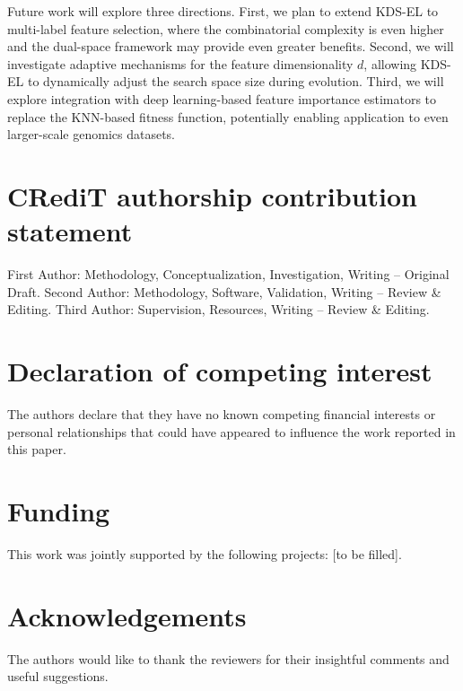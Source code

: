 \documentclass[a4paper,fleqn]{cas-dc}
\begin{document}
\begin{sloppypar}
	\par{
	Future work will explore three directions.
	First, we plan to extend KDS-EL to multi-label feature selection,
	where the combinatorial complexity is even higher and the dual-space
	framework may provide even greater benefits.
	Second, we will investigate adaptive mechanisms for the feature
	dimensionality $d$, allowing KDS-EL to dynamically adjust the
	search space size during evolution.
	Third, we will explore integration with deep learning-based
	feature importance estimators to replace the KNN-based fitness
	function, potentially enabling application to even larger-scale
	genomics datasets.
	}



	\section*{CRediT authorship contribution statement}
	\par{First Author: Methodology, Conceptualization, Investigation,
	Writing -- Original Draft.
	Second Author: Methodology, Software, Validation, Writing -- Review
	\& Editing.
	Third Author: Supervision, Resources, Writing -- Review \& Editing.}

	\section*{Declaration of competing interest}
	\par{The authors declare that they have no known competing financial
	interests or personal relationships that could have appeared to
	influence the work reported in this paper.}

	\section*{Funding}
	\par{This work was jointly supported by the following projects:
	[to be filled].}

	\section*{Acknowledgements}
	\par{The authors would like to thank the reviewers for their
	insightful comments and useful suggestions.}


	
	

\end{sloppypar}
\end{document}
